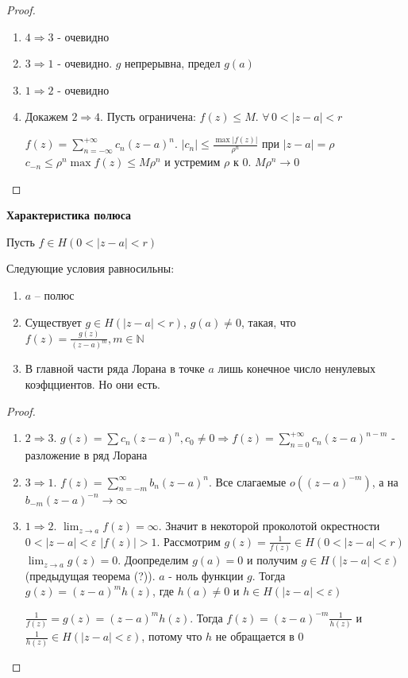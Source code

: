 \begin{proof}
    \begin{enumerate}
        \item $4 \Rightarrow 3$ - очевидно
        \item $3 \Rightarrow 1$ - очевидно. $g$ непрерывна, предел $g(a)$
        \item $1 \Rightarrow 2$ - очевидно
        \item Докажем $2 \Rightarrow 4$.
        Пусть ограничена: $f(z) \leqslant M$. $\forall \, 0 < |z - a| < r$

        $f(z) = \sum_{n = -\infty}^{+\infty} c_n(z - a)^n$. $|c_n| \leqslant \frac{\max |f(z)|}{\rho^n}$ при $|z - a| = \rho$
        $c_{-n} \leqslant \rho^n \max f(z) \leqslant M \rho^n$ и устремим $\rho$ к $0$. $M \rho^n \rightarrow 0$
    \end{enumerate}
\end{proof}

\begin{theorem}
    \textbf{Характеристика полюса}

    Пусть $f \in H(0 < |z - a| < r)$

    Следующие условия равносильны:

    \begin{enumerate}
        \item $a$ -- полюс
        \item Существует $g \in H(|z - a| < r)$, $g(a) \neq 0$, такая, что $f(z) = \frac{g(z)}{(z - a)^m}, m \in \mathbb{N}$
        \item В главной части ряда Лорана в точке $a$ лишь конечное число ненулевых коэфцциентов. Но они есть.
    \end{enumerate}
\end{theorem}

\begin{proof}
    \begin{enumerate}
        \item $2 \Rightarrow 3$. $g(z) = \sum c_n (z - a)^n, c_0 \neq 0 \Rightarrow f(z) = \sum_{n = 0}^{+\infty} c_n(z - a)^{n - m}$ - разложение в ряд Лорана
        \item $3 \Rightarrow 1$. $f(z) = \sum_{n = -m}^{\infty} b_n(z - a)^n$. Все слагаемые $o((z - a)^{-m})$, а на $b_{-m}(z - a)^{-n} \rightarrow \infty$
        \item $1 \Rightarrow 2$. $\lim_{z \to a} f(z) = \infty$. Значит в некоторой проколотой окрестности $0 <|z - a| < \varepsilon$
        $|f(z)| > 1$. Рассмотрим $g(z) = \frac{1}{f(z)} \in H(0 < |z - a| < r)$
        $\lim_{z \to a} g(z) = 0$. Доопределим $g(a) = 0$ и получим $g \in H(|z - a| < \varepsilon)$
        (предыдущая теорема (?)). $a$ - ноль функции $g$. Тогда $g(z) = (z - a)^m h(z)$,
        где $h(a) \neq 0$ и $h \in H(|z - a| < \varepsilon)$

        $\frac{1}{f(z)} = g(z) = (z - a)^m h(z)$. Тогда $f(z) = (z - a)^{-m} \frac{1}{h(z)}$ и
        $\frac{1}{h(z)} \in H(|z - a| < \varepsilon)$, потому что $h$ не обращается в 0
    \end{enumerate}
\end{proof}

